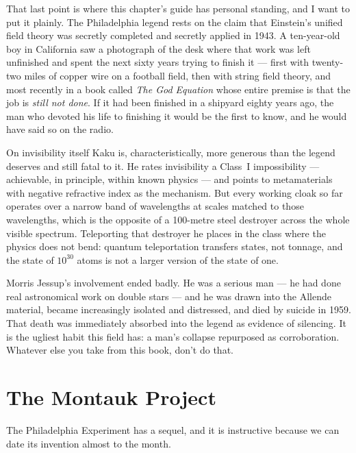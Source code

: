 That last point is where this chapter's guide has personal standing, and I want to put it plainly.
The Philadelphia legend rests on the claim that Einstein's unified field theory was secretly
completed and secretly applied in 1943. A ten-year-old boy in California saw a photograph of the
desk where that work was left unfinished and spent the next sixty years trying to finish it ---
first with twenty-two miles of copper wire on a football field, then with string field theory, and
most recently in a book called \emph{The God Equation} whose entire premise is that the job is
\emph{still not done}. 
If it had been finished in a shipyard eighty years ago, the man who devoted his life to finishing
it would be the first to know, and he would have said so on the radio.

On invisibility itself Kaku is, characteristically, more generous than the legend deserves and
still fatal to it. He rates invisibility a Class~I impossibility --- achievable, in principle,
within known physics --- and points to metamaterials with negative refractive index as the
mechanism. But every working cloak so far operates over a narrow band of wavelengths at scales
matched to those wavelengths, which is the opposite of a 100-metre steel destroyer across the whole
visible spectrum. Teleporting that destroyer he places in the class where the physics does not
bend: quantum teleportation transfers states, not tonnage, and the state of $10^{30}$ atoms is not
a larger version of the state of one.

\begin{funfact}
Morris Jessup's involvement ended badly. He was a serious man --- he had done real astronomical
work on double stars --- and he was drawn into the Allende material, became increasingly isolated
and distressed, and died by suicide in 1959. That death was immediately absorbed into the legend
as evidence of silencing. It is the ugliest habit this field has: a man's collapse repurposed as
corroboration. Whatever else you take from this book, don't do that.
\end{funfact}

\section{The Montauk Project}\label{sec:montauk}

The Philadelphia Experiment has a sequel, and it is instructive because we can date its
invention almost to the month.

